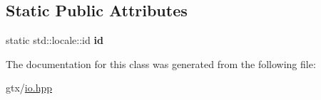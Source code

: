 \subsection*{Static Public Attributes}
\begin{DoxyCompactItemize}
\item 
\hypertarget{classglm_1_1io_1_1format__punct_a763f60aeaecec9290917ed1d83b79838}{static std\-::locale\-::id {\bfseries id}}\label{classglm_1_1io_1_1format__punct_a763f60aeaecec9290917ed1d83b79838}

\end{DoxyCompactItemize}


The documentation for this class was generated from the following file\-:\begin{DoxyCompactItemize}
\item 
gtx/\hyperlink{io_8hpp}{io.\-hpp}\end{DoxyCompactItemize}
